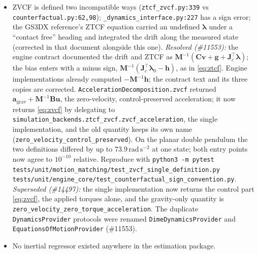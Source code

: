 \documentclass[11pt,a4paper]{article}
\newcommand{\R}{\mathbb{R}}
\newcommand{\bv}{\mathbf{v}}
\newcommand{\ba}{\mathbf{a}}
\newcommand{\bu}{\mathbf{u}}
\newcommand{\bh}{\mathbf{h}}
\newcommand{\bM}{\mathbf{M}}
\newcommand{\bB}{\mathbf{B}}
\newcommand{\bJ}{\mathbf{J}}
\newcommand{\blambda}{\boldsymbol{\lambda}}
\begin{document}
\begin{itemize}[nosep]
    \emph{Acceptance:} central differences with step $h=10^{-6}$ (truncation
    $O(h^2)\approx10^{-12}$, round-off $O(\epsilon/h)\approx10^{-10}$) match
    both Jacobians within $10^{-7}$ absolute at seeded random poses and
    rotation angles $10^{-5},10^{-3},0.4,1.3,2.5,\pi-10^{-3}$ (none on the
    cut locus, which is excluded above), and
    $\mathcal{L}(q,\mathcal{R}(q,\bv))=\bv$ within $10^{-9}$.  Measured
    (seed 11550, five poses per angle): the closed forms agree with the
    differences to $\le5\times10^{-10}$; the former zero-velocity retraction
    Jacobian was off by $1.7\times10^{-4}$ at $10^{-3}$\,rad rising to $0.53$
    near $\pi$, and the former identity by $4.5\times10^{-4}$ rising to $1.54$,
    so the tolerance separates the forms by over three decades.  Reverting
    either form alone fails 7 of the 21 tests, and both together 13.  Reproduce with
    \texttt{python3 -m pytest tests/unit/estimation/test\_dime\_manifold\_jacobians.py}.
    Unqualified: the chart is the product $\R^3\times SO(3)$, not the
    $SE(3)$ exponential; MOSAIC's floating-base manifold spline must state its
    own chart and Jacobians.
  \item ZVCF is defined two incompatible ways (\texttt{ztcf\_zvcf.py:339}
    vs \texttt{counterfactual.py:62,98}); \texttt{\_dynamics\_interface.py:227} has a
    sign error; the GS3DX reference's ZTCF equation carried an undefined
    $\blambda$ under a ``contact free'' heading and integrated the drift along
    the measured state (corrected in that document alongside this one).
    \emph{Resolved (\#11553):} the engine contract documented the drift and
    ZTCF as $\bM^{-1}(\mathbf{C}\bv+\mathbf{g}+\bJ_c^{\!\top}\blambda)$; the bias enters with a
    minus sign, $\bM^{-1}(\bJ_c^{\!\top}\blambda_0-\bh)$, as in
    \eqref{eq:ztcf}.  Engine implementations already computed $-\bM^{-1}\bh$;
    the contract text and its three copies are corrected.
    \texttt{AccelerationDecomposition.zvcf} returned
    $\ba_{\mathrm{grav}}+\bM^{-1}\bB\bu$, the zero-velocity, control-preserved
    acceleration; it now returns \eqref{eq:zvcf} by delegating to
    \texttt{simulation\_backends.ztcf\_zvcf.zvcf\_acceleration}, the single
    implementation, and the old quantity keeps its own name
    (\texttt{zero\_velocity\_control\_preserved}).  On the planar double
    pendulum the two definitions differed by up to
    $73.9\,\mathrm{rad\,s^{-2}}$ at one state; both entry points now agree to
    $10^{-10}$ relative.  Reproduce with
    \texttt{python3 -m pytest tests/unit/motion\_matching/test\_zvcf\_single\_definition.py
    tests/unit/engine\_core/test\_counterfactual\_sign\_convention.py}.
    \emph{Superseded (\#14497):} the single implementation now returns the
    control part \eqref{eq:zvcf}, the applied torques alone, and the
    gravity-only quantity is \texttt{zero\_velocity\_zero\_torque\_acceleration}.
    The duplicate \texttt{DynamicsProvider} protocols were renamed \texttt{DimeDynamicsProvider} and \texttt{EquationsOfMotionProvider} (\#11553).
  \item No inertial regressor existed anywhere in the estimation package.
\end{itemize}
\end{document}
